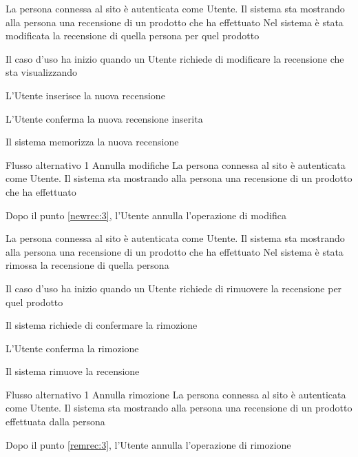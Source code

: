 
{}
{La persona connessa al sito è autenticata come Utente. Il sistema sta mostrando alla persona una recensione di un prodotto che ha effettuato}
{Nel sistema è stata modificata la recensione di quella persona per quel prodotto}
{\begin{enumCU}
	\item Il caso d'uso ha inizio quando un Utente richiede di modificare la recensione che sta visualizzando
	\item L'Utente inserisce la nuova recensione \label{newrec:3}
	\item L'Utente conferma la nuova recensione inserita
	\item Il sistema memorizza la nuova recensione
\end{enumCU}}
%
{Flusso alternativo 1}%
{Annulla modifiche}%
{La persona connessa al sito è autenticata come Utente. Il sistema sta mostrando alla persona una recensione di un prodotto che ha effettuato}
{\postNulle}%
{\begin{enumCU}
		\item Dopo il punto \ref{newrec:3}, l'Utente annulla l'operazione di modifica
	\end{enumCU}}%


{}
{La persona connessa al sito è autenticata  come Utente. Il sistema sta mostrando alla persona una recensione di un prodotto che ha effettuato}
{Nel sistema è stata rimossa la recensione di quella persona}
{\begin{enumCU}
	\item Il caso d'uso ha inizio quando un Utente richiede di rimuovere la recensione per quel prodotto
	\item Il sistema richiede di confermare la rimozione \label{remrec:3}
	\item L'Utente conferma la rimozione
	\item Il sistema rimuove la recensione
\end{enumCU}}
%
{Flusso alternativo 1}%
{Annulla rimozione}%
{La persona connessa al sito è autenticata  come Utente. Il sistema sta mostrando alla persona una recensione di un prodotto effettuata dalla persona}
{\postNulle}%
{\begin{enumCU}
		\item Dopo il punto \ref{remrec:3}, l'Utente annulla l'operazione di rimozione
	\end{enumCU}}%

